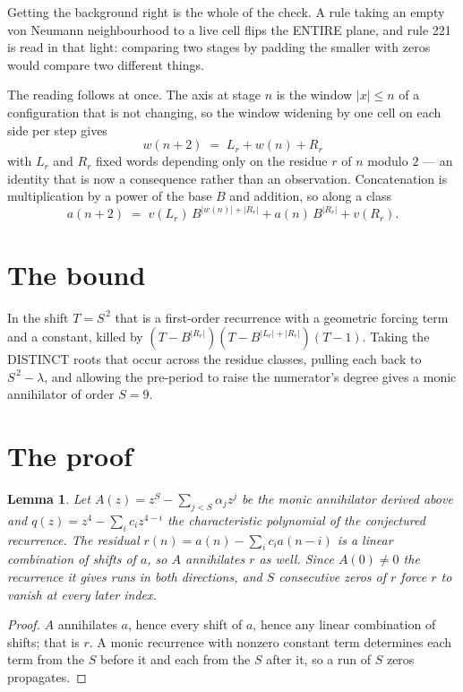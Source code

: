 \documentclass[11pt,a4paper]{article}
\theoremstyle{plain}
\newtheorem{lemma}[theorem]{Lemma}
\theoremstyle{definition}
\begin{document}
Getting the background right is the whole of the check. A rule taking an empty von Neumann
neighbourhood to a live cell flips the ENTIRE plane, and rule 221 is read
in that light: comparing two stages by padding the smaller with zeros would compare two
different things.

The reading follows at once. The axis at stage $n$ is the window $|x|\le n$ of a configuration
that is not changing, so the window widening by one cell on each side per step gives
\[
w(n+2)\;=\;L_r + w(n) + R_r
\]
with $L_r$ and $R_r$ fixed words depending only on the residue $r$ of $n$ modulo $2$ --- an
identity that is now a consequence rather than an observation. Concatenation is multiplication
by a power of the base $B$ and addition, so along a class
\[
a(n+2)\;=\;v(L_r)\,B^{|w(n)|+|R_r|} + a(n)\,B^{|R_r|} + v(R_r).
\]

\section{The bound}

In the shift $T=S^{\,2}$ that is a first-order recurrence with a geometric forcing term and a
constant, killed by $(T-B^{|R_r|})(T-B^{|L_r|+|R_r|})(T-1)$. Taking the DISTINCT roots that
occur across the residue classes, pulling each back to $S^{\,2}-\lambda$, and allowing the
pre-period to raise the numerator's degree gives a monic annihilator of order $S=9$.

\section{The proof}

\begin{lemma}\label{lem:crit}
Let $A(z)=z^S-\sum_{j<S}\alpha_jz^{j}$ be the monic annihilator derived above and
$q(z)=z^{4}-\sum_ic_iz^{4-i}$ the characteristic polynomial of the conjectured
recurrence. The residual $r(n)=a(n)-\sum_ic_ia(n-i)$ is a linear combination of shifts of $a$,
so $A$ annihilates $r$ as well. Since $A(0)\ne0$ the recurrence it gives runs in both
directions, and $S$ consecutive zeros of $r$ force $r$ to vanish at every later index.
\end{lemma}

\begin{proof}
$A$ annihilates $a$, hence every shift of $a$, hence any linear combination of shifts; that is
$r$. A monic recurrence with nonzero constant term determines each term from the $S$ before it
and each from the $S$ after it, so a run of $S$ zeros propagates.
\end{proof}
\end{document}
